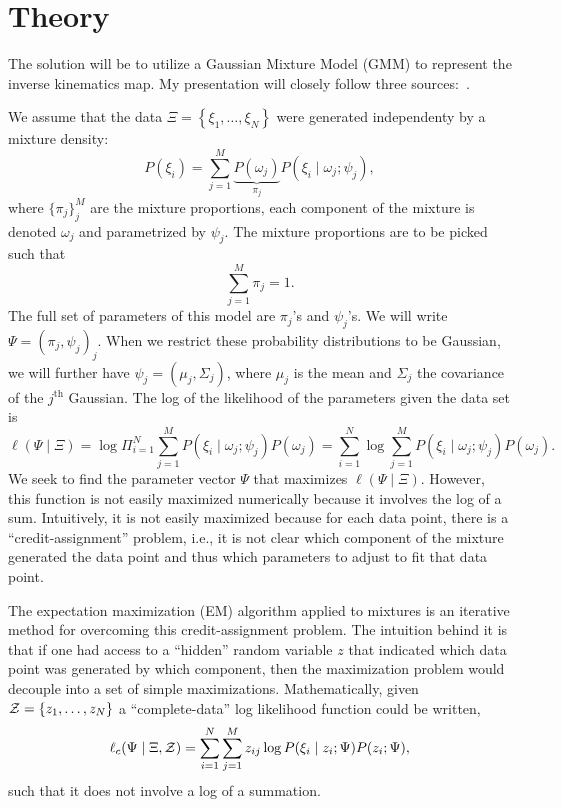 \section{Theory}
\label{sec:theory}

The solution will be to utilize a Gaussian Mixture Model (GMM) to represent the
inverse kinematics map. My presentation will closely follow three
sources:~\cite{mclachlan2007algorithm,ghahramani1993solving,xu2017data}.

We assume that the data $\Xi = \left\{ \xi_1, \ldots, \xi_N \right\}$ were
generated independenty by a mixture density:
%
\begin{equation}
    P(\xi_i) = \sum_{j=1}^M \underbrace{P(\omega_j)}_{\pi_j} 
        P(\xi_i \mid \omega_j; \psi_j),
    \label{eq:mixture_density}
\end{equation}
%
where $\{\pi_j\}_j^M$ are the mixture proportions, each component of the mixture
is denoted $\omega_j$ and parametrized by $\psi_j$. The mixture proportions are
to be picked such that \[ \sum_{j=1}^M \pi_j = 1. \] The full set of parameters
of this model are $\pi_j$'s and $\psi_j$'s. We will write $\Psi = (\pi_j,
\psi_j)_j$. When we restrict these probability distributions to be Gaussian, we
will further have $\psi_j = (\mu_j, \Sigma_j)$, where $\mu_j$ is the mean and
$\Sigma_j$ the covariance of the $j^{\textrm{th}}$ Gaussian. The log of the
likelihood of the parameters given the data set is
%
\begin{equation}
    \ell(\Psi \mid \Xi) = \log{ \Pi_{i=1}^N \sum_{j=1}^M P(\xi_i \mid \omega_j; 
    \psi_j) P(\omega_j) } = \sum_{i=1}^N \log{ \sum_{j=1}^M 
    P(\xi_i \mid \omega_j; \psi_j) P(\omega_j). }
    \label{eq:loglike}
\end{equation}
%
We seek to find the parameter vector $\Psi$ that maximizes $\ell(\Psi \mid
\Xi)$. However, this function is not easily maximized numerically because it
involves the log of a sum. Intuitively, it is not easily maximized because for
each data point, there is a ``credit-assignment'' problem, i.e., it is not clear
which component of the mixture generated the data point and thus which
parameters to adjust to fit that data point.

The expectation maximization (EM) algorithm applied to mixtures is an iterative
method for overcoming this credit-assignment problem. The intuition behind it is
that if one had access to a ``hidden'' random variable $z$ that indicated which
data point was generated by which component, then the maximization problem would
decouple into a set of simple maximizations. Mathematically, given $\mathcal{Z} =
\{z_1, \ldots, z_N \}$ a ``complete-data'' log likelihood function could be
written,
%
\begin{equation}
    \ell_c(\Psi \mid \Xi, \mathcal{Z}) = \sum_{i=1}^N \sum_{j=1}^M z_{ij} \log{
        P(\xi_i \mid z_i; \Psi)P(z_i; \Psi),
    }
    \label{eq:complete_loglike}
\end{equation}
%
such that it does not involve a log of a summation.

